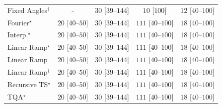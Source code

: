 \begin{tabular}{l|cccc|}
Fixed Angles$^\dagger$ & {\cellcolor[HTML]{000000}} \color[HTML]{F1F1F1} {\cellcolor{white}} \color{black} - & {\cellcolor[HTML]{DDF2D8}} \color[HTML]{000000} $30$ [$39$--$144$] & {\cellcolor[HTML]{F0F9ED}} \color[HTML]{000000} $10$ [$100$] & {\cellcolor[HTML]{EFF9EB}} \color[HTML]{000000} $12$ [$40$--$100$] \\
Fourier$^\star$ & {\cellcolor[HTML]{E8F6E4}} \color[HTML]{000000} $20$ [$40$--$50$] & {\cellcolor[HTML]{DDF2D8}} \color[HTML]{000000} $30$ [$39$--$144$] & {\cellcolor[HTML]{4BB062}} \color[HTML]{F1F1F1} $111$ [$40$--$100$] & {\cellcolor[HTML]{EAF7E6}} \color[HTML]{000000} $18$ [$40$--$100$] \\
Interp.$^\star$ & {\cellcolor[HTML]{E8F6E4}} \color[HTML]{000000} $20$ [$40$--$50$] & {\cellcolor[HTML]{DDF2D8}} \color[HTML]{000000} $30$ [$39$--$144$] & {\cellcolor[HTML]{4BB062}} \color[HTML]{F1F1F1} $111$ [$40$--$100$] & {\cellcolor[HTML]{EAF7E6}} \color[HTML]{000000} $18$ [$40$--$100$] \\
Linear Ramp$^\star$ & {\cellcolor[HTML]{E8F6E4}} \color[HTML]{000000} $20$ [$40$--$50$] & {\cellcolor[HTML]{DDF2D8}} \color[HTML]{000000} $30$ [$39$--$144$] & {\cellcolor[HTML]{4BB062}} \color[HTML]{F1F1F1} $111$ [$40$--$100$] & {\cellcolor[HTML]{EAF7E6}} \color[HTML]{000000} $18$ [$40$--$100$] \\
Linear Ramp & {\cellcolor[HTML]{E8F6E4}} \color[HTML]{000000} $20$ [$40$--$50$] & {\cellcolor[HTML]{DDF2D8}} \color[HTML]{000000} $30$ [$39$--$144$] & {\cellcolor[HTML]{4BB062}} \color[HTML]{F1F1F1} $111$ [$40$--$100$] & {\cellcolor[HTML]{EAF7E6}} \color[HTML]{000000} $18$ [$40$--$100$] \\
Linear Ramp$^\dagger$ & {\cellcolor[HTML]{E8F6E4}} \color[HTML]{000000} $20$ [$40$--$50$] & {\cellcolor[HTML]{DDF2D8}} \color[HTML]{000000} $30$ [$39$--$144$] & {\cellcolor[HTML]{4BB062}} \color[HTML]{F1F1F1} $111$ [$40$--$100$] & {\cellcolor[HTML]{EAF7E6}} \color[HTML]{000000} $18$ [$40$--$100$] \\
Recursive TS$^\star$ & {\cellcolor[HTML]{E8F6E4}} \color[HTML]{000000} $20$ [$40$--$50$] & {\cellcolor[HTML]{DDF2D8}} \color[HTML]{000000} $30$ [$39$--$144$] & {\cellcolor[HTML]{4BB062}} \color[HTML]{F1F1F1} $111$ [$40$--$100$] & {\cellcolor[HTML]{EAF7E6}} \color[HTML]{000000} $18$ [$40$--$100$] \\
TQA$^\star$ & {\cellcolor[HTML]{E8F6E4}} \color[HTML]{000000} $20$ [$40$--$50$] & {\cellcolor[HTML]{DDF2D8}} \color[HTML]{000000} $30$ [$39$--$144$] & {\cellcolor[HTML]{4BB062}} \color[HTML]{F1F1F1} $111$ [$40$--$100$] & {\cellcolor[HTML]{EAF7E6}} \color[HTML]{000000} $18$ [$40$--$100$] \\

\end{tabular}
